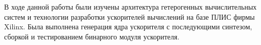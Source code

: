
В ходе данной работы были изучены архитектура гетерогенных вычислительных систем и технологии разработки ускорителей вычислений на базе ПЛИС фирмы Xilinx. Была выполнена генерация ядра ускорителя с последующими синтезом, сборкой и тестированием бинарного модуля ускорителя.

